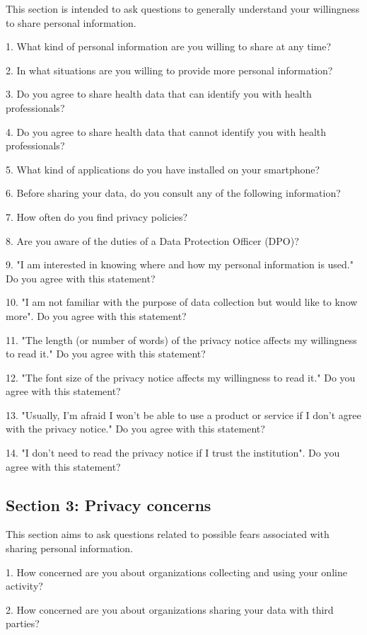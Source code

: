 This section is intended to ask questions to generally understand your willingness to share personal information.

1. What kind of personal information are you willing to share at any time?

2. In what situations are you willing to provide more personal information?

3. Do you agree to share health data that can identify you with health professionals?


4. Do you agree to share health data that cannot identify you with health professionals?

5. What kind of applications do you have installed on your smartphone?

6. Before sharing your data, do you consult any of the following information?

7. How often do you find privacy policies?

8. Are you aware of the duties of a Data Protection Officer (DPO)?

9. "I am interested in knowing where and how my personal information is used." Do you agree with this statement?

10. "I am not familiar with the purpose of data collection but would like to know more". Do you agree with this statement?

11. "The length (or number of words) of the privacy notice affects my willingness to read it." Do you agree with this statement?

12. "The font size of the privacy notice affects my willingness to read it." Do you agree with this statement?

13. "Usually, I'm afraid I won't be able to use a product or service if I don't agree with the privacy notice." Do you agree with this statement?

14. "I don't need to read the privacy notice if I trust the institution". Do you agree with this statement?

\subsection*{Section 3: Privacy concerns}

This section aims to ask questions related to possible fears associated with sharing personal information.


1. How concerned are you about organizations collecting and using your online activity?

2. How concerned are you about organizations sharing your data with third parties?

